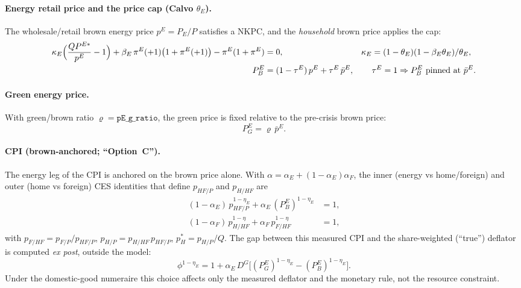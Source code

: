 \documentclass[11pt,a4paper]{article}
\newcommand{\DG}{D^{G}}
\newcommand{\PEB}{P^{E}_{B}}
\newcommand{\PEG}{P^{E}_{G}}
\newcommand{\pE}{p^{E}}
\begin{document}
\paragraph{Energy retail price and the price cap (Calvo $\theta_E$).} The
wholesale/retail brown energy price $\pE=P_E/P$ satisfies a NKPC, and the
\emph{household} brown price applies the cap:
\begin{align}
\kappa_E\Bigl(\frac{Q P^{E*}}{\pE}-1\Bigr)
+\beta_E\,\pi^{E}(+1)\bigl(1+\pi^{E}(+1)\bigr)
-\pi^{E}(1+\pi^{E})&=0,
& \kappa_E&=(1-\theta_E)(1-\beta_E\theta_E)/\theta_E,\\
\PEB &= (1-\tau^{E})\,\pE+\tau^{E}\,\bar\pE,
&& \tau^{E}=1\Rightarrow \PEB\ \text{pinned at }\bar\pE .
\label{eq:cap}
\end{align}

\paragraph{Green energy price.} With green/brown ratio $\varrho=\texttt{pE\_g\_ratio}$,
the green price is fixed relative to the pre-crisis brown price:
\begin{equation}
\PEG=\varrho\,\bar\pE . \label{eq:pEG}
\end{equation}

\paragraph{CPI (brown-anchored; ``Option~C'').} The energy leg of the CPI is
anchored on the brown price alone. With $\alpha=\alpha_E+(1-\alpha_E)\alpha_F$,
the inner (energy vs home/foreign) and outer (home vs foreign) CES identities
that define $p_{HF/P}$ and $p_{H/HF}$ are
\begin{align}
(1-\alpha_E)\,p_{HF/P}^{1-\eta_E}+\alpha_E\,(\PEB)^{1-\eta_E}&=1, \label{eq:innernest}\\
(1-\alpha_F)\,p_{H/HF}^{1-\eta}+\alpha_F\,p_{F/HF}^{1-\eta}&=1, \label{eq:outernest}
\end{align}
with $p_{F/HF}=p_{F/P}/p_{HF/P}$, $p_{H/P}=p_{H/HF}\,p_{HF/P}$, $p_H^{*}=p_{H/P}/Q$.
The gap between this measured CPI and the share-weighted (``true'') deflator is
computed \emph{ex post}, outside the model:
\begin{equation}
\phi^{1-\eta_E}=1+\alpha_E\,\DG\bigl[(\PEG)^{1-\eta_E}-(\PEB)^{1-\eta_E}\bigr].
\end{equation}
Under the domestic-good numeraire this choice affects only the measured deflator
and the monetary rule, not the resource constraint.
\end{document}
